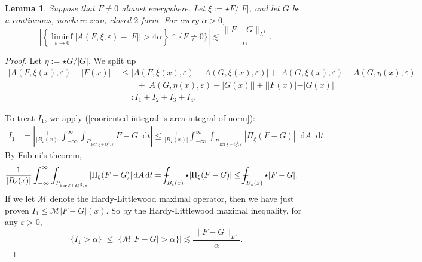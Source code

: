 \documentclass[reqno,11pt]{amsart}
\newcommand*\dif{\mathop{}\!\mathrm{d}}
\newtheorem{lemma}[theorem]{Lemma}
\theoremstyle{definition}
\numberwithin{equation}{section}
\def\Xint#1{\mathchoice
{\XXint\displaystyle\textstyle{#1}}%
{\XXint\textstyle\scriptstyle{#1}}%
{\XXint\scriptstyle\scriptscriptstyle{#1}}%
{\XXint\scriptscriptstyle\scriptscriptstyle{#1}}%
\!\int}
\def\XXint#1#2#3{{\setbox0=\hbox{$#1{#2#3}{\int}$ }
\vcenter{\hbox{$#2#3$ }}\kern-.6\wd0}}
\def\dashint{\Xint-}
\begin{document}
\begin{lemma}\label{PLDT bound mass}
Suppose that $F \neq 0$ almost everywhere.
Let $\xi := \star F/|F|$, and let $G$ be a continuous, nowhere zero, closed $2$-form.
For every $\alpha > 0$,
$$\left|\left\{\liminf_{\varepsilon \to 0} |A(F, \xi, \varepsilon) - |F|| > 4\alpha\right\} \cap \{F \neq 0\}\right| \lesssim \frac{\|F - G\|_{L^1}}{\alpha}.$$
\end{lemma}
\begin{proof}
Let $\eta := \star G/|G|$.
We split up
\begin{align*}
|A(F, \xi(x), \varepsilon) - |F(x)||
&\leq |A(F, \xi(x), \varepsilon) - A(G, \xi(x), \varepsilon)| + |A(G, \xi(x), \varepsilon) - A(G, \eta(x), \varepsilon)| \\
&\qquad + |A(G, \eta(x), \varepsilon) - |G(x)|| + ||F(x)| - |G(x)||\\
&=: I_1 + I_2 + I_3 + I_4.
\end{align*}

To treat $I_1$, we apply (\ref{cooriented integral is area integral of norm}):
\begin{align*}
I_1
&= \left|\frac{1}{|B_\varepsilon(x)|} \int_{-\infty}^\infty \int_{P_{\ker \xi + t\xi^\sharp, \varepsilon}} F - G \dif t\right| 
\leq \frac{1}{|B_\varepsilon(x)|} \int_{-\infty}^\infty \int_{P_{\ker \xi + t\xi^\sharp, \varepsilon}} |\Pi_\xi(F - G)| \dif A \dif t.
\end{align*}
By Fubini's theorem, 
\begin{align*}
\frac{1}{|B_\varepsilon(x)|} \int_{-\infty}^\infty \int_{P_{\ker \xi + t\xi^\sharp, \varepsilon}} |\Pi_\xi(F - G)| \dif A \dif t
&= \dashint_{B_\varepsilon(x)} \star|\Pi_\xi(F - G)| \leq \dashint_{B_\varepsilon(x)} \star |F - G|.
\end{align*}
If we let $\mathcal M$ denote the Hardy-Littlewood maximal operator, then we have just proven $I_1 \leq \mathcal M|F - G|(x)$.
So by the Hardy-Littlewood maximal inequality, for any $\varepsilon > 0$,
$$|\{I_1 > \alpha\}| \leq |\{\mathcal M |F - G| > \alpha\}| \lesssim \frac{\|F - G\|_{L^1}}{\alpha}.$$


\end{proof}
\end{document}
